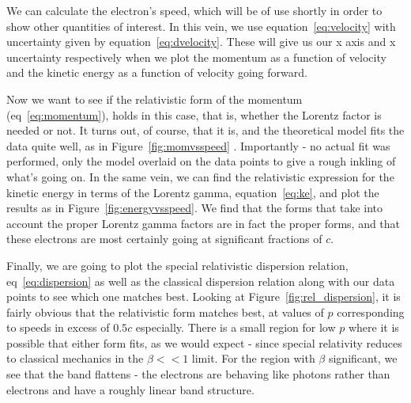 \documentclass[reprint, nobibnotes, amssymb, amsmath, amsfonts, physics, mathtools, mathrsfs, floatfix]{revtex4-1}
\begin{document}
       We can calculate the electron's speed, which will be of use shortly in order to show other quantities of interest.  In this vein, we use equation~\ref{eq:velocity} with uncertainty given by equation~\ref{eq:dvelocity}.  These will give us our x axis and x uncertainty respectively when we plot the momentum as a function of velocity and the kinetic energy as a function of velocity going forward.

       \hspace{.25cm}

       Now we want to see if the relativistic form of the momentum (eq~\ref{eq:momentum}), holds in this case, that is, whether the Lorentz factor is needed or not.  It turns out, of course, that it is, and the theoretical model fits the data quite well, as in Figure~\ref{fig:momvsspeed} .  Importantly - no actual fit was performed, only the model overlaid on the data points to give a rough inkling of what's going on.  In the same vein, we can find the relativistic expression for the kinetic energy in terms of the Lorentz gamma, equation~\ref{eq:ke}, and plot the results as in Figure~\ref{fig:energyvsspeed}.  We find that the forms that take into account the proper Lorentz gamma factors are in fact the proper forms, and that these electrons are most certainly going at significant fractions of $c$.

       \hspace{.25cm}

       Finally, we are going to plot the special relativistic dispersion relation, eq~\ref{eq:dispersion} as well as the classical dispersion relation along with our data points to see which one matches best.  Looking at Figure~\ref{fig:rel_dispersion}, it is fairly obvious that the relativistic form matches best, at values of $p$ corresponding to speeds in excess of $0.5c$ especially.  There is a small region for low $p$ where it is possible that either form fits, as we would expect - since special relativity reduces to classical mechanics in the $\beta << 1$ limit.  For the region with $\beta$ significant, we see that the band flattens - the electrons are behaving like photons rather than electrons and have a roughly linear band structure.

       \hspace{.25cm}
\end{document}
